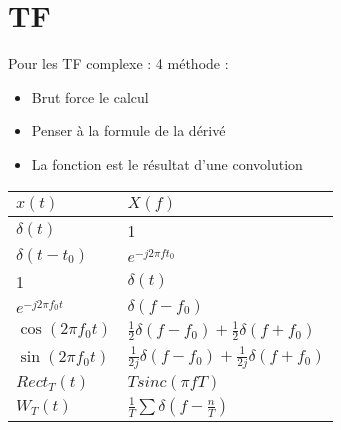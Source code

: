 \documentclass{article}
\theoremstyle{plain}%
\theoremstyle{definition}
\theoremstyle{remark}
\begin{document}
\section{TF}
Pour les TF complexe : 4 méthode : \begin{itemize}
    \item Brut force le calcul
    \item Penser à la formule de la dérivé 
    \item La fonction est le résultat d'une convolution
\end{itemize}
\begin{table}[!ht]
    \centering
    \begin{tabular}{|l|l|}
        \hline
        $x(t)$ & $X(f)$ \\ \hline
        $\delta(t)$ & 1 \\ \hline
        $\delta(t - t_0)$ & $e^{-j 2 \pi f t_0}$ \\ \hline
        1 & $\delta(t)$ \\ \hline
        $e^{-j 2 \pi f_0 t}$ & $\delta(f - f_0)$ \\ \hline
        $\cos (2 \pi f_0t)$ & $\frac{1}{2}\delta(f - f_0) + \frac{1}{2}\delta (f + f_0)$ \\ \hline
        $\sin (2 \pi f_0t)$ & $\frac{1}{2j}\delta(f - f_0) + \frac{1}{2j}\delta (f + f_0)$ \\ \hline
        $Rect_T (t)$ & $T sinc (\pi f T)$ \\ \hline
        $W_T(t)$ & $\frac{1}{T} \sum \delta(f - \frac{n}{T})$ \\ \hline
    \end{tabular}
\end{table}
\end{document}

